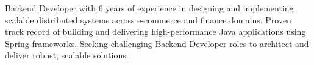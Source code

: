 \overview
{Backend Developer with 6 years of experience in designing and implementing scalable distributed systems across e-commerce and finance domains. Proven track record of building and delivering high-performance Java applications using Spring frameworks. Seeking challenging Backend Developer roles to architect and deliver robust, scalable solutions.}

